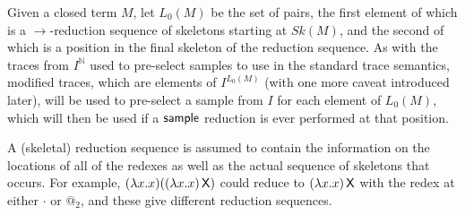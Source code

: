 Given a closed term $M$, let $L_0(M)$ be the set of pairs, the first element of which is a $\to$-reduction sequence of skeletons starting at $\mathit{Sk}(M)$, and the second of which is a position in the final skeleton of the reduction sequence. 
As with the traces from $I^{\mathbb N}$ used to pre-select samples to use in the standard trace semantics, modified traces, which are elements of $I^{L_0(M)}$ (with one more caveat introduced later), will be used to pre-select a sample from $I$ for each element of $L_0(M)$, which will then be used if a $\mathsf{sample}$ reduction is ever performed at that position.


A (skeletal) reduction sequence is assumed to contain the information on the locations of all of the redexes as well as the actual sequence of skeletons that occurs. For example, $(\lambda x. x) ((\lambda x. x) \, \mathsf{X})$ could reduce to $(\lambda x. x) \, \mathsf{X}$ with the redex at either $\cdot$ or $@_2$, and these give different reduction sequences.

